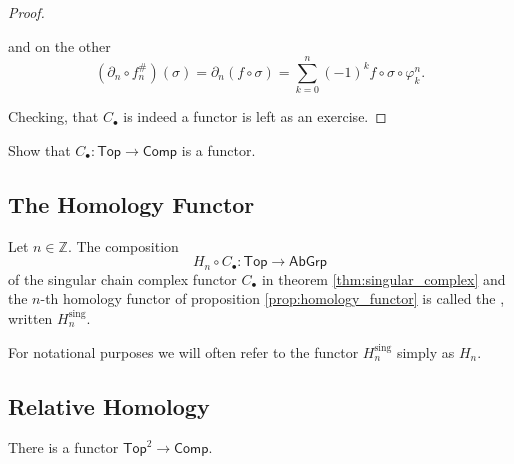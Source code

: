 \begin{proof}
\begin{enumerate}[label = \textit{Step \arabic*:},wide = 0pt, itemsep = 1.5ex]
\begin{equation*}
			\end{equation*}
			\noindent and on the other
			\begin{equation*}
				(\partial_n \circ f^\#_n)(\sigma) = \partial_n(f \circ \sigma) = \sum_{k = 0}^n (-1)^k f \circ \sigma \circ \varphi^n_k.
			\end{equation*}
	\end{enumerate}
	Checking, that $C_\bullet$ is indeed a functor is left as an exercise.
\end{proof}

\begin{exercise}
	Show that $C_\bullet : \mathsf{Top} \to \mathsf{Comp}$ is a functor.
\end{exercise}

\subsection*{The Homology Functor}
\begin{definition}
	Let $n \in \mathbb{Z}$. The composition 
	\begin{equation}
		H_n \circ C_\bullet : \mathsf{Top} \to \mathsf{AbGrp}
	\end{equation}
	\noindent of the singular chain complex functor $C_\bullet$ in theorem \ref{thm:singular_complex} and the $n$-th homology functor of proposition \ref{prop:homology_functor} is called the , written $H^{\mathrm{sing}}_n$.
\end{definition}

\begin{remark}
	For notational purposes we will often refer to the functor $H_n^{\mathrm{sing}}$ simply as $H_n$.
\end{remark}

\subsection*{Relative Homology}

\begin{proposition}
	There is a functor $\mathsf{Top}^2 \to \mathsf{Comp}$.
\end{proposition}

